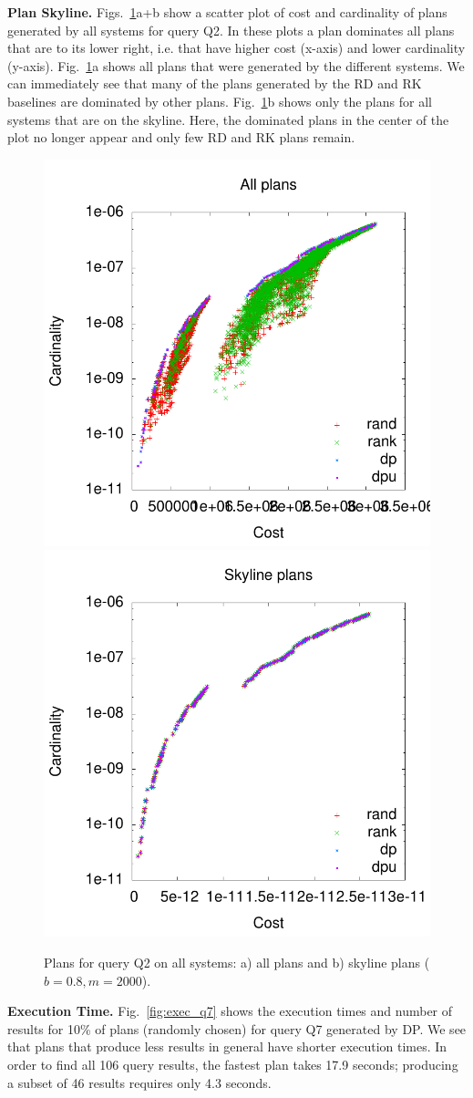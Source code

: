 \textbf{Plan Skyline.} Figs.~\ref{fig:pareto_q2_skyline}a+b show a scatter
plot of cost and cardinality of plans generated by all systems for
query Q2. In these plots a plan dominates all plans that are to its
lower right, i.e. that have higher cost (x-axis) and lower cardinality
(y-axis). Fig.~\ref{fig:pareto_q2_skyline}a shows all plans that were
generated by the different systems. We can immediately see that many
of the plans generated by the RD and RK baselines are dominated by
other plans. Fig.~\ref{fig:pareto_q2_skyline}b shows only the plans
for all systems that are on the skyline. Here, the dominated plans in
the center of the plot no longer appear and only few RD and RK plans
remain.

\begin{figure}[htb]
  \centering
  \includegraphics[width=0.49\linewidth]{figs/plans_q2_all.pdf}
  \includegraphics[width=0.49\linewidth]{figs/plans_q2_sky.pdf}
  \caption{Plans for query Q2 on all systems: a) all plans and b)
    skyline plans ($b=0.8,m=2000$).}
  \label{fig:pareto_q2_skyline}
\end{figure}

\textbf{Execution Time.}  Fig.~\ref{fig:exec_q7} shows the execution
times and number of results for 10\% of plans (randomly chosen) for
query Q7 generated by DP. We see that plans that produce less results
in general have shorter execution times. In order to find all 106
query results, the fastest plan takes 17.9 seconds; producing a subset
of 46 results requires only 4.3 seconds.

